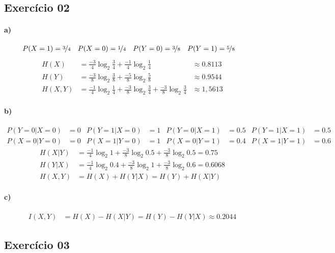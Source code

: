\documentclass{article}
\begin{document}
    \subsection*{Exercício 02}
    \paragraph{a)}
    \begin{align*}
        P(X=1)&=\nicefrac{3}{4}&
        P(X=0)&=\nicefrac{1}{4}&
        P(Y=0)&=\nicefrac{3}{8}&
        P(Y=1)&=\nicefrac{5}{8}
    \end{align*}
    \begin{align*}
        H(X)&=\frac{-3}{4}\log_{2}\frac{3}{4} + \frac{-1}{4}\log_{2}\frac{1}{4} 
        &\approx 0.8113\\
        H(Y)&=\frac{-3}{8}\log_{2}\frac{3}{8} +\frac{-5}{8}\log_{2}\frac{5}{8} 
        &\approx 0.9544\\
        H(X,Y)&=\frac{-1}{4}\log_{2}\frac{1}{4} + 
                \frac{-3}{8}\log_{2}\frac{3}{4} +
                \frac{-3}{8}\log_{2}\frac{3}{4}
                &\approx 1,5613
    \end{align*}
    \paragraph{b)}
    \begin{align*}
       P(Y=0|X=0)&=0 & P(Y=1|X=0)&=1 & P(Y=0|X=1)&=0.5 & P(Y=1|X=1)&=0.5 \\
       P(X=0|Y=0)&=0 & P(X=1|Y=0)&=1 & P(X=0|Y=1)&=0.4 & P(X=1|Y=1)&=0.6 
    \end{align*}
    \begin{align*}
        H(X|Y)&=\frac{-1}{4}\log_{2}1 + \frac{-3}{8}\log_{2}0.5 + \frac{-3}{8}\log_{2}0.5=0.75 \\ 
        H(Y|X)&=\frac{-1}{4}\log_{2}0.4 + \frac{-3}{8}\log_{2}1 + \frac{-3}{8}\log_{2}0.6=0.6068\\
        H(X,Y)&=H(X) + H(Y|X)=H(Y) + H(X|Y) 
    \end{align*}
    \paragraph{c)}
    \begin{align*}
        I(X,Y)&=H(X)-H(X|Y)=H(Y)-H(Y|X)\approx 0.2044  
    \end{align*}
    \subsection*{Exercício 03}
\end{document}
